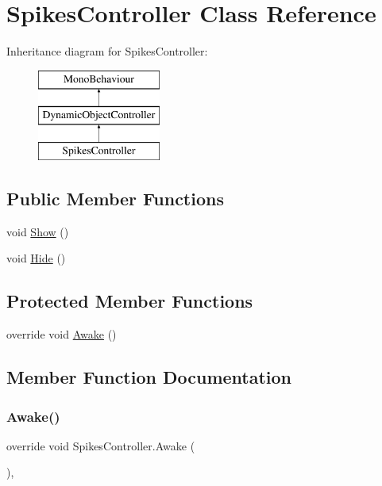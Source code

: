 \hypertarget{class_spikes_controller}{}\section{Spikes\+Controller Class Reference}
\label{class_spikes_controller}
Inheritance diagram for Spikes\+Controller\+:\begin{figure}[H]
\begin{center}
\leavevmode
\includegraphics[height=3.000000cm]{class_spikes_controller}
\end{center}
\end{figure}
\subsection*{Public Member Functions}
\begin{DoxyCompactItemize}
\item 
void \mbox{\hyperlink{class_spikes_controller_a24419970bc1bf77a5b70f12fd502a98b}{Show}} ()
\item 
void \mbox{\hyperlink{class_spikes_controller_a94bdba9f7e3ac69a290d3107df82818d}{Hide}} ()
\end{DoxyCompactItemize}
\subsection*{Protected Member Functions}
\begin{DoxyCompactItemize}
\item 
override void \mbox{\hyperlink{class_spikes_controller_aab3fd43128a06340e93256838a971535}{Awake}} ()
\end{DoxyCompactItemize}


\subsection{Member Function Documentation}
\mbox{\label{class_spikes_controller_aab3fd43128a06340e93256838a971535}} 
\subsubsection{\texorpdfstring{Awake()}{Awake()}}
{\footnotesize\ttfamily override void Spikes\+Controller.\+Awake (\begin{DoxyParamCaption}{ }\end{DoxyParamCaption})\hspace{0.3cm}{\ttfamily [protected]}, {\ttfamily [virtual]}}



